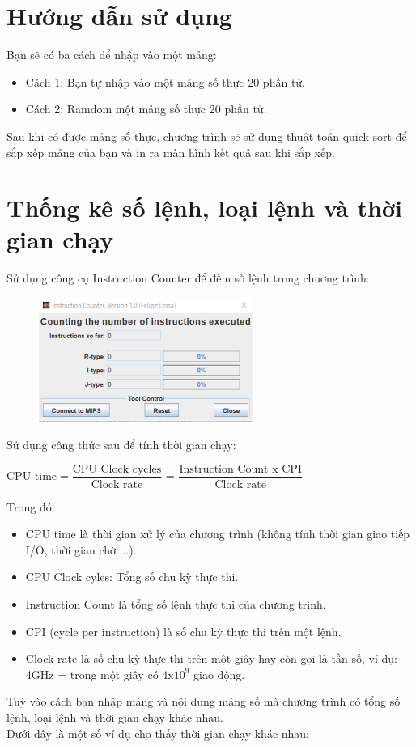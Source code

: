 \documentclass[a4paper]{article}
\begin{document}
\section{Hướng dẫn sử dụng}
Bạn sẽ có ba cách để nhập vào một mảng:
\begin{itemize}
	\item Cách 1: Bạn tự nhập vào một mảng số thực 20 phần tử.
	\item Cách 2: Ramdom một mảng số thực 20 phần tử.
\end{itemize}
Sau khi có được mảng số thực, chương trình sẽ sử dụng thuật toán quick sort để sắp xếp mảng của bạn và in ra màn hình kết quả sau khi sắp xếp.
\section{Thống kê số lệnh, loại lệnh và thời gian chạy}
Sử dụng công cụ Instruction Counter để đếm số lệnh trong chương trình:
\begin{center}
	\begin{figure}[h!]
		\begin{center}
			\includegraphics[width=7cm]{Images/IC.png}
		\end{center}
	\end{figure}
\end{center}
Sử dụng công thức sau để tính thời gian chạy:
\begin{center}
	$\text{CPU time} = \dfrac{\text{CPU Clock cycles}}{\text{Clock rate}}$ = $\dfrac{\text{Instruction Count x CPI}}{\text{Clock rate}}$
\end{center}
Trong đó:
\begin{itemize}
	\item CPU time là thời gian xử lý của chương trình (không tính thời gian giao tiếp I/O, thời gian chờ ...).
	\item CPU Clock cyles: Tổng số chu kỳ thực thi.
	\item Instruction Count là tổng số lệnh thực thi của chương trình.
	\item CPI (cycle per instruction) là số chu kỳ thực thi trên một lệnh.
	\item Clock rate là số chu kỳ thực thi trên một giây hay còn gọi là tần số, ví dụ: 4GHz = trong một giây có $4\text{x}10^9$ giao động.
\end{itemize}
Tuỳ vào cách bạn nhập mảng và nội dung mảng số mà chương trình có tổng số lệnh, loại lệnh và thời gian chạy khác nhau.\\
Dưới đây là một số ví dụ cho thấy thời gian chạy khác nhau:
\end{document}
